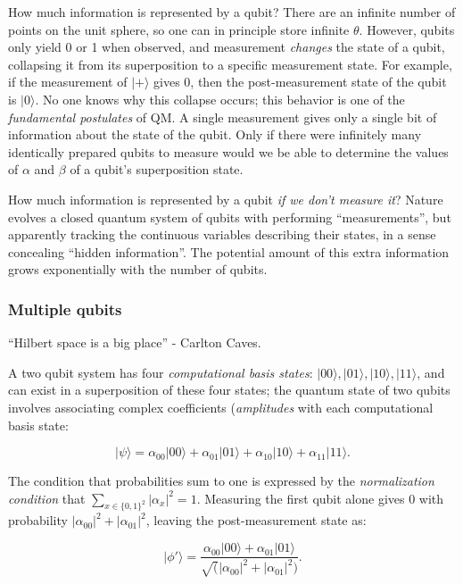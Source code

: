 \documentclass{article}
\numberwithin{equation}{section}
\newcommand{\bracket}[1]{|#1\rangle}
\begin{document}
How much information is represented by a qubit? There are an infinite number of points on the unit sphere, so one can in principle store infinite $\theta$. However, qubits only yield 0 or 1 when observed, and measurement \textit{changes} the state of a qubit, collapsing it from its superposition to a specific measurement state. For example, if the measurement of $\bracket{+}$ gives 0, then the post-measurement state of the qubit is $\bracket{0}$. No one knows why this collapse occurs; this behavior is one of the \textit{fundamental postulates} of QM. A single measurement gives only a single bit of information about the state of the qubit. Only if there were infinitely many identically prepared qubits to measure would we be able to determine the values of $\alpha$ and $\beta$ of a qubit's superposition state.

How much information is represented by a qubit \textit{if we don't measure it}? Nature evolves a closed quantum system of qubits with performing ``measurements'', but apparently tracking the continuous variables describing their states, in a sense concealing ``hidden information''. The potential amount of this extra information grows exponentially with the number of qubits.

\subsubsection{Multiple qubits}

``Hilbert space is a big place'' - Carlton Caves.

A two qubit system has four \textit{computational basis states}: $\bracket{00}, \bracket{01}, \bracket{10}, \bracket{11}$, and can exist in a superposition of these four states; the quantum state of two qubits involves associating complex coefficients (\textit{amplitudes} with each computational basis state:

\begin{equation} \label{eq:1.4}
\bracket{\psi} = \alpha_{00} \bracket{00} + \alpha_{01} \bracket{01} + \alpha_{10} \bracket{10} + \alpha_{11} \bracket{11}.
\end{equation}

The condition that probabilities sum to one is expressed by the \textit{normalization condition} that $\sum_{x \in \{0, 1\}^2} |\alpha_x|^2 = 1$. Measuring the first qubit alone gives 0 with probability $|\alpha_{00}|^2 + |\alpha_{01}|^2$, leaving the post-measurement state as:

\begin{equation} \label{eq:1.5}
\bracket{\phi'} = \frac{\alpha_{00} \bracket{00} + \alpha_{01} \bracket{01}}{\sqrt(|\alpha_{00}|^2 + |\alpha_{01}|^2)}.
\end{equation}
\end{document}
